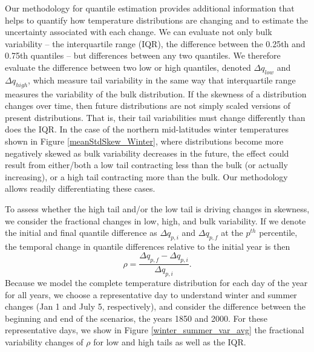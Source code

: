 \documentclass{ametsoc}
\begin{document}
Our methodology for quantile estimation provides additional information that helps to
 quantify how temperature distributions are changing and to estimate the uncertainty associated with each change. 
We can evaluate not only bulk variability  -- the interquartile range (IQR), the difference between the 0.25th and 0.75th quantiles -- but differences between any two quantiles. 
We therefore evaluate the difference between two low or high quantiles, denoted $\Delta q_{low}$ and $\Delta q_{high}$, which measure tail variability in the same way that interquartile range measures the variability of the bulk distribution.
If the skewness of a distribution changes over time, then future distributions are not simply scaled versions of present distributions. That is, their tail variabilities must change differently than does the IQR.
  In the case of the northern mid-latitudes winter temperatures shown in Figure \ref{meanStdSkew_Winter}, where distributions become more negatively skewed as bulk variability decreases in the future, the effect could result from either/both a low tail contracting less than the bulk (or actually increasing), or a high tail contracting more than the bulk. Our methodology allows readily differentiating these cases.

To assess whether the high tail and/or the low tail is driving changes in skewness, we consider the fractional changes in low, high, and bulk variability.
If we denote the initial and final quantile difference as $\Delta q_{p, i}$ and $\Delta q_{p, f}$ at the $p^{th}$ percentile, the temporal change in quantile differences relative to the initial year is then
\begin{equation}
	\rho = \frac{\Delta q_{p, f} - \Delta q_{p, i}}{\Delta q_{p, i}}.
\label{eq:relnorm}
\end{equation}
 Because we model the complete temperature distribution for each day of the year for all years, we choose a representative day to understand winter and summer changes (Jan 1 and July 5, respectively), and consider the difference between the beginning and end of the scenarios, the years 1850 and 2000. For these representative days, we show in Figure \ref{winter_summer_var_avg} the fractional variability changes of $\rho$ for low and high tails as well as the IQR. 
\end{document}
